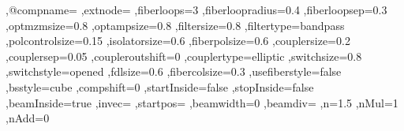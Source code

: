 {        ,@compname=\@empty
        ,extnode=\@empty
        ,fiberloops=3
        ,fiberloopradius=0.4
        ,fiberloopsep=0.3
        ,optmzmsize=0.8
        ,optampsize=0.8
        ,filtersize=0.8
        ,filtertype=bandpass
        ,polcontrolsize=0.15
        ,isolatorsize=0.6
        ,fiberpolsize=0.6
        ,couplersize=0.2
        ,couplersep=0.05
        ,coupleroutshift=0
        ,couplertype=elliptic
        ,switchsize=0.8
        ,switchstyle=opened
        ,fdlsize=0.6
        ,fibercolsize=0.3
        ,usefiberstyle=false
        ,bsstyle=cube
        ,compshift=0
        ,startInside=false
        ,stopInside=false
        ,beamInside=true
        ,invec=\@empty
        ,startpos=\@empty
        ,beamwidth=0
        ,beamdiv=\@empty
        ,n=1.5
        ,nMul=1
        ,nAdd=0
}%
%
%
%
\def\pst@draw@component#1#2{%
    \def\@@comp{%
       #2
       \ifx\POK@extnode\@empty\else
          \pnode(! \pst@optexpdict ExtNode end){\POK@extnode@name}
       \fi
    }%
    \ifPOE@endbox%
       \ifx\POK@label@offset\@empty
          \psset{labeloffset=0}
       \fi
       \psset{position=1}%
    \fi%
    \ncline[linestyle=none,fillstyle=none,npos=]{\optexp@nodeA}{\optexp@nodeB}%
    \begingroup
    \psset{style=OptComp}
    \ifPOE@component@optional
      \psset{style=OptionalStyle}%
    \fi
    \ifx\POK@position\@empty
        \ifx\POK@abspos\@empty
           \ncput[nrot=:U,npos=]{\put@Comp{\@@comp}}
        \else
           \nlput[nrot=:U](\optexp@nodeA)(\optexp@nodeB){\POK@abspos}{\put@Comp{\@@comp}}
        \fi
    \else
       \ncput[nrot=:U,npos=\POK@position]{\put@Comp{\@@comp}}
    \fi
    \endgroup
    \ifPOE@label@innerlabel
       \ifdim\optboxwidth>0pt
          \psset{labeloffset=0, labelref=relative}
          \put@Label{\parbox{\optboxwidth}{#1}}%
       \else
          \put@Label{#1}%
       \fi
    \else
       \put@Label{#1}%
    \fi
    \ifPOE@debug@showoptdots
        \psdot[linecolor=red](\optexp@nodeLabel)
        \psdot[linecolor=red](\optexp@nodeLabelShifted)
        \psdot[linecolor=black](\optexp@nodeA)
        \psdot[linecolor=black](\optexp@nodeB)
    \fi
\ignorespaces}%
